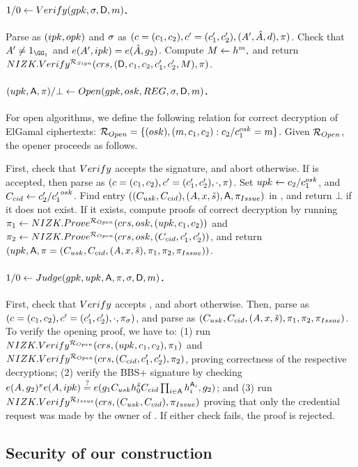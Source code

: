 \paragraph{$1/0 \gets Verify(gpk,\sigma,\mathsf{D},m)$.} %
Parse \gpk as $(ipk,opk)$ and $\sigma$ as $(c=(c_1,c_2),c'=(c'_1,c'_2),
(A',\hat{A},d), \pi)$. Check that $A' \neq 1_{\GG_1}$ and $e(A',ipk) =
e(\hat{A},g_2)$. Compute $M \gets h^m,$ and return
$NIZK.Verify^{\mathcal{R}_{Sign}}(crs,(\mathsf{D},c_1,c_2,c'_1,c'_2,M),
\pi)$.

\paragraph{$(\upk,\Attrs,\oproof)/\bot \gets
  \Open(\gpk,\osk,\trans,\sig,\DAttrs,\msg)$.} %
For open algorithms, we define the following relation for correct decryption of
ElGamal ciphertexts: $\mathcal{R}_{Open} = \lbrace (osk),(m,c_1,c_2):
c_2/c_1^{osk} = m \rbrace$. Given $\mathcal{R}_{Open}$, the opener proceeds as
follows.

First, check that $Verify$ accepts the signature, and abort otherwise. If \sig
is accepted, then parse \sig as $(c=(c_1,c_2),c'=(c'_1,c'_2),\cdot,\pi)$.
Set $upk \gets c_2/c_1^{osk}$, and $C_{cid} \gets c'_2/{c'_1}^{osk}$. Find
entry $((C_{usk},C_{cid}),(A,x,\tilde{s}),\mathsf{A},\pi_{Issue})$ in \trans,
and return $\bot$ if it does not exist. If it exists, compute proofs of correct
decryption
by running $\pi_1 \gets NIZK.Prove^{\mathcal{R}_{Open}}(crs,osk,
(upk,c_1,c_2))$ and $\pi_2 \gets NIZK.Prove^{\mathcal{R}_{Open}}(crs,
osk,(C_{cid},c'_1,c'_2))$, and return $(upk,\mathsf{A},\pi = (C_{usk},
C_{cid},(A,x,\tilde{s}),\pi_1,\pi_2,\pi_{Issue}))$.

\paragraph{$1/0 \gets Judge(gpk,upk,\mathsf{A},\pi,\sigma,\mathsf{D},
  m)$.} %
First, check that $Verify$ accepts \sig, and abort otherwise. Then, parse
\sig as $(c=(c_1,c_2),c'=(c'_1,c'_2),\cdot,\pi_\sigma)$, and parse \oproof
as $(C_{usk},C_{cid},(A,x,\tilde{s}),\pi_1,\pi_2,
\pi_{Issue})$. To verify
the opening proof, we have to: (1) run $NIZK.Verify^{\mathcal{R}_{Open}}(crs,
(upk,c_1,c_2),\pi_1)$ and $NIZK.Verify^{\mathcal{R}_{Open}}(crs,
(C_{cid},c'_1,c'_2),\pi_2)$, proving correctness of the respective
decryptions; (2) verify the BBS+ signature by checking $e(A,g_2)^x
e(A,ipk) \stackrel{?}{=} e(g_1C_{usk}h_0^{\tilde{s}}C_{cid}
\prod_{i \in \mathsf{A}}h_i^{\mathsf{A}_i},g_2)$; and (3) run
$NIZK.Verify^{\mathcal{R}_{Issue}}(crs,(C_{usk},C_{cid}),\pi_{Issue})$
proving that only the credential request was made by the owner of \usk. If
either check fails, the proof is rejected.

\subsection{Security of our \GSAC construction}
\label{ssec:gsac-const-sec}


